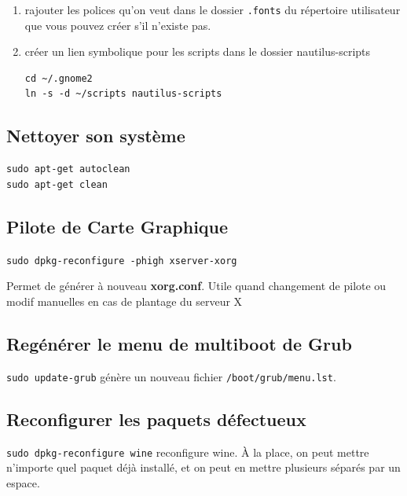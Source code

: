 \documentclass[a4paper,twoside]{article}
\begin{document}
\begin{enumerate}
Fermez votre session, puis ouvrez-la à nouveau pour que votre nouvelle configuration soit prise en compte.

%


\item rajouter les polices qu'on veut dans le dossier \texttt{.fonts} du répertoire utilisateur que vous pouvez créer s'il n'existe pas.

\item créer un lien symbolique pour les scripts dans le dossier nautilus-scripts
\begin{verbatim}
cd ~/.gnome2
ln -s -d ~/scripts nautilus-scripts
\end{verbatim}

\end{enumerate}

\subsection{Nettoyer son système}

\begin{verbatim}
sudo apt-get autoclean
sudo apt-get clean
\end{verbatim}


\subsection{Pilote de Carte Graphique}
\verb|sudo dpkg-reconfigure -phigh xserver-xorg|

Permet de générer à nouveau \textbf{xorg.conf}. Utile quand changement de pilote ou modif manuelles en cas de plantage du serveur X

\subsection{Regénérer le menu de multiboot de Grub}
\verb|sudo update-grub| génère un nouveau fichier \verb|/boot/grub/menu.lst|.

\subsection{Reconfigurer les paquets défectueux}
\verb|sudo dpkg-reconfigure wine| reconfigure wine. \`A la place, on peut mettre n'importe quel paquet déjà installé, et on peut en mettre plusieurs séparés par un espace.
\end{document}
